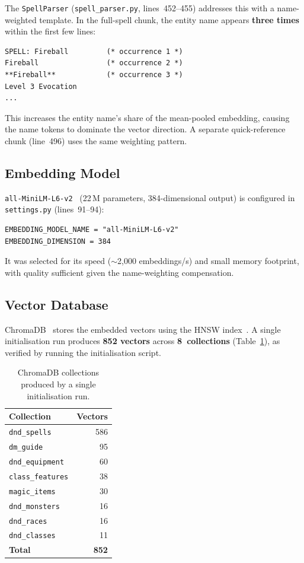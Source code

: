 \documentclass[12pt,a4paper]{article}
\begin{document}
The \texttt{SpellParser} (\texttt{spell\_parser.py}, lines~452--455)
addresses this with a name-weighted template. In the full-spell chunk, the
entity name appears \textbf{three times} within the first few lines:

\begin{lstlisting}[language={},basicstyle=\ttfamily\small,frame=single,numbers=none]
SPELL: Fireball         (* occurrence 1 *)
Fireball                (* occurrence 2 *)
**Fireball**            (* occurrence 3 *)
Level 3 Evocation
...
\end{lstlisting}

This increases the entity name's share of the mean-pooled embedding,
causing the name tokens to dominate the vector direction. A separate
quick-reference chunk (line~496) uses the same weighting pattern.

\subsection{Embedding Model}

\texttt{all-MiniLM-L6-v2}~\cite{reimers2019sbert} (22\,M parameters,
384-dimensional output) is configured in \texttt{settings.py}
(lines~91--94):
\begin{lstlisting}
EMBEDDING_MODEL_NAME = "all-MiniLM-L6-v2"
EMBEDDING_DIMENSION = 384
\end{lstlisting}

It was selected for its speed (${\sim}$2,000 embeddings/s) and small memory
footprint, with quality sufficient given the name-weighting compensation.

\subsection{Vector Database}

ChromaDB~\cite{chromadb} stores the embedded vectors using the HNSW
index~\cite{malkov2018hnsw}. A single initialisation run produces
\textbf{852 vectors} across \textbf{8~collections}
(Table~\ref{tab:collections}), as verified by running the initialisation
script.

\begin{table}[H]
\centering
\caption{ChromaDB collections produced by a single initialisation run.}
\label{tab:collections}
\small
\begin{tabular}{lr}
\toprule
\textbf{Collection} & \textbf{Vectors} \\
\midrule
\texttt{dnd\_spells}       & 586 \\
\texttt{dm\_guide}         & 95 \\
\texttt{dnd\_equipment}    & 60 \\
\texttt{class\_features}   & 38 \\
\texttt{magic\_items}      & 30 \\
\texttt{dnd\_monsters}     & 16 \\
\texttt{dnd\_races}        & 16 \\
\texttt{dnd\_classes}      & 11 \\
\midrule
\textbf{Total}             & \textbf{852} \\
\bottomrule
\end{tabular}
\end{table}
\end{document}

